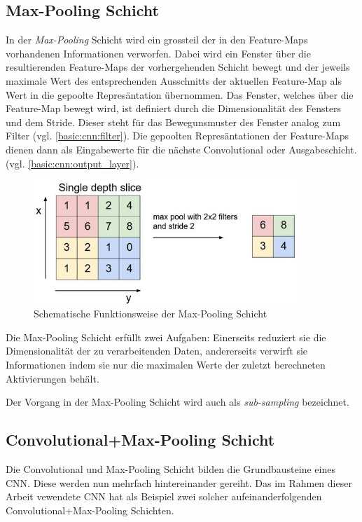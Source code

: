 \subsection{Max-Pooling Schicht}
\label{basic:cnn:pooling}
In der \emph{Max-Pooling} Schicht wird ein grossteil der in den Feature-Maps vorhandenen Informationen verworfen. Dabei wird ein Fenster über die resultierenden Feature-Maps der vorhergehenden Schicht bewegt und der jeweils maximale Wert des entsprechenden Ausschnitts der aktuellen Feature-Map als Wert in die gepoolte Represäntation übernommen. Das Fenster, welches über die Feature-Map bewegt wird, ist definiert durch die Dimensionalität des Fensters und dem Stride. Dieser steht für das Bewegunsmuster des Fenster analog zum Filter (vgl. \ref{basic:cnn:filter}). Die gepoolten Represäntationen der Feature-Maps dienen dann als Eingabewerte für die nächste Convolutional oder Ausgabeschicht. (vgl. \ref{basic:cnn:output_layer}).

\begin{figure}[H]
	\centering
	\includegraphics[width=10cm]{img/max_pooling}
	\caption{Schematische Funktionsweise der Max-Pooling Schicht}
\end{figure}

Die Max-Pooling Schicht erfüllt zwei Aufgaben: Einerseits reduziert sie die Dimensionalität der zu verarbeitenden Daten, andererseits verwirft sie  Informationen indem sie nur die maximalen Werte der zuletzt berechneten Aktivierungen behält.

Der Vorgang in der Max-Pooling Schicht wird auch als \emph{sub-sampling} bezeichnet.

\subsection{Convolutional+Max-Pooling Schicht}
Die Convolutional und Max-Pooling Schicht bilden die Grundbausteine eines CNN. Diese werden nun mehrfach hintereinander gereiht. Das im Rahmen dieser Arbeit vewendete CNN hat als Beispiel zwei solcher aufeinanderfolgenden Convolutional+Max-Pooling Schichten.\\

